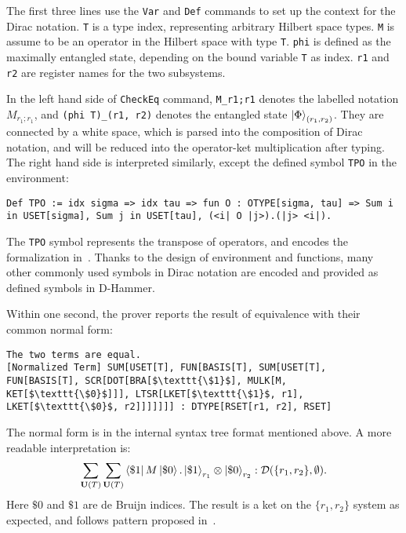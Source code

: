The first three lines use the \texttt{\textcolor{NavyBlue}{Var}} and \texttt{\textcolor{NavyBlue}{Def}} commands to set up the context for the Dirac notation.
\texttt{T} is a type index, representing arbitrary Hilbert space types. \texttt{M} is assume to be an operator in the Hilbert space with type \texttt{T}. \texttt{phi} is defined as the maximally entangled state, depending on the bound variable \texttt{T} as index.
\texttt{r1} and \texttt{r2} are register names for the two subsystems.

In the left hand side of \texttt{\textcolor{NavyBlue}{CheckEq}} command, \texttt{M\_r1;r1} denotes the labelled notation $M_{r_1; r_1}$, and \texttt{(phi T)\_(r1, r2)} denotes the entangled state $\ket{\Phi}_{(r_1, r_2)}$. They are connected by a white space, which is parsed into the composition of Dirac notation, and will be reduced into the operator-ket multiplication after typing. The right hand side is interpreted similarly, except the defined symbol \texttt{TPO} in the environment:

\begin{lstlisting}[style=dhammer]
Def TPO := idx sigma => idx tau => fun O : OTYPE[sigma, tau] => Sum i in USET[sigma], Sum j in USET[tau], (<i| O |j>).(|j> <i|).
\end{lstlisting}

The \texttt{TPO} symbol represents the transpose of operators, and encodes the formalization in~. Thanks to the design of environment and functions, many other commonly used symbols in Dirac notation are encoded and provided as defined symbols in D-Hammer.

Within one second, the prover reports the result of equivalence with their common normal form:
    \begin{lstlisting}[style=dhammer]
The two terms are equal.
[Normalized Term] SUM[USET[T], FUN[BASIS[T], SUM[USET[T], FUN[BASIS[T], SCR[DOT[BRA[$\texttt{\$1}$], MULK[M, KET[$\texttt{\$0}$]]], LTSR[LKET[$\texttt{\$1}$, r1], LKET[$\texttt{\$0}$, r2]]]]]]] : DTYPE[RSET[r1, r2], RSET]
    \end{lstlisting}

The normal form is in the internal syntax tree format mentioned above. A more readable interpretation is:
\[
\sum_{\mathbf{U}(T)} \sum_{\mathbf{U}(T)} \bra{\$1}M\ket{\$ 0} . \ket{\$1}_{r_1} \otimes \ket{\$0}_{r_2} : \mathcal{D}(\{r_1, r_2\}, \emptyset).
\]
Here $\$0$ and $\$1$ are de Bruijn indices. The result is a ket on the $\{r_1, r_2\}$ system as expected, and follows pattern proposed in~.




